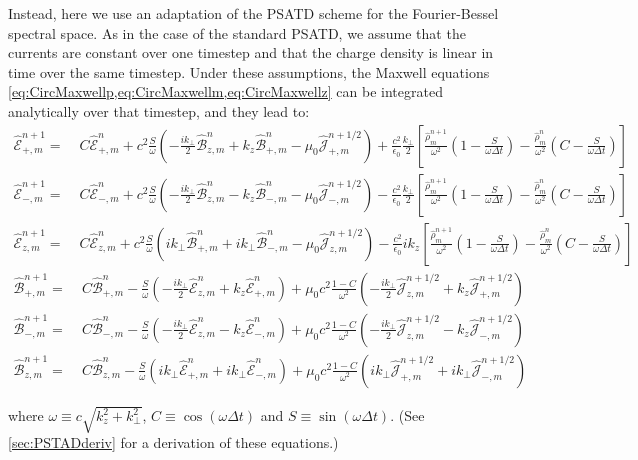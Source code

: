 \documentclass[a4paper]{article}   	%
\newcommand{\tB}[2]{\spectral{B}_{#1,m}^{#2}}
\newcommand{\tE}[2]{\spectral{E}_{#1,m}^{#2}}
\newcommand{\tj}[2]{\spectral{J}_{#1,m}^{#2}}
\newcommand{\trho}[1]{\spectral{\rho}_{m}^{#1}}
\newcommand{\spectral}[1]{\hat{\mathcal{#1}}}
\begin{document}
Instead, here we use an adaptation of the PSATD scheme \citep{Haber} for the
Fourier-Bessel spectral space. As in the case of the standard
PSATD, we assume that the currents are constant over one timestep and
that the charge density is linear in time over the same timestep. Under these
assumptions, the Maxwell equations \cref{eq:CircMaxwellp,eq:CircMaxwellm,eq:CircMaxwellz} can be integrated
analytically over that timestep, and they lead to:
\begin{align*}
\tE{+}{n+1} = \; & C \tE{+}{n} + 
c^2\frac{S}{\omega}\left(-\frac{ik_\perp }{2} \tB{z}{n} + k_z\tB{+}{n}
- \mu_0 \tj{+}{n+1/2} \right) + \frac{c^2}{\epsilon_0}
\frac{k_\perp}{2}\left[ \frac{\trho{n+1}}{\omega^2}\left(
  1 - \frac{S}{\omega\Delta t}\right) -
\frac{\trho{n}}{\omega^2}\left( C -\frac{S}{\omega\Delta t}\right)\right]  & \\
\tE{-}{n+1} =\; & C \tE{-}{n} +
c^2\frac{S}{\omega}\left(- \frac{ik_\perp }{2} \tB{z}{n} - k_z\tB{-}{n}
- \mu_0 \tj{-}{n+1/2} \right) - \frac{c^2}{\epsilon_0}
\frac{k_\perp}{2}\left[ \frac{\trho{n+1}}{\omega^2}\left(
  1 - \frac{S}{\omega\Delta t}\right) - \frac{\trho{n}}{\omega^2}
\left( C - \frac{S}{\omega\Delta t}\right)\right]  &\\
\tE{z}{n+1} =\; & C \tE{z}{n} + 
c^2\frac{S}{\omega}\left(ik_\perp \tB{+}{n} + ik_\perp \tB{-}{n}
- \mu_0 \tj{z}{n+1/2} \right) - \frac{c^2}{\epsilon_0}
ik_z\left[ \frac{\trho{n+1}}{\omega^2}\left(
  1 - \frac{S}{\omega\Delta t}\right) - \frac{\trho{n}}{\omega^2}
\left( C - \frac{S}{\omega\Delta t}\right)\right]  &
\end{align*}
\begin{align*}
\tB{+}{n+1} = \; & C \tB{+}{n} - 
\frac{S}{\omega}\left(-\frac{ik_\perp }{2} \tE{z}{n} + k_z\tE{+}{n}
\right) + \mu_0 c^2\frac{1-C}{\omega^2} \left( -\frac{ik_\perp }{2}
  \tj{z}{n+1/2} + k_z \tj{+}{n+1/2} \right)& \\
\tB{-}{n+1} =\; & C \tB{-}{n} - 
\frac{S}{\omega}\left(- \frac{ik_\perp }{2} \tE{z}{n} - k_z\tE{-}{n}
\right) + \mu_0 c^2\frac{1-C}{\omega^2} \left( - \frac{ik_\perp }{2}
  \tj{z}{n+1/2} - k_z \tj{-}{n+1/2} \right) &\\
\tB{z}{n+1} =\; & C \tB{z}{n} - 
\frac{S}{\omega}\left(ik_\perp \tE{+}{n} + ik_\perp \tE{-}{n}
\right) + \mu_0 c^2\frac{1-C}{\omega^2} \left( ik_\perp
  \tj{+}{n+1/2} + ik_\perp \tj{-}{n+1/2} \right)&
\end{align*}

\noindent where $\omega \equiv c\sqrt{k_z^2 + k_\perp^2}$, $C \equiv \cos(\omega \Delta t)$
and $S \equiv \sin(\omega \Delta t) $. (See \cref{sec:PSTADderiv} for a
derivation of these equations.)
\end{document}
